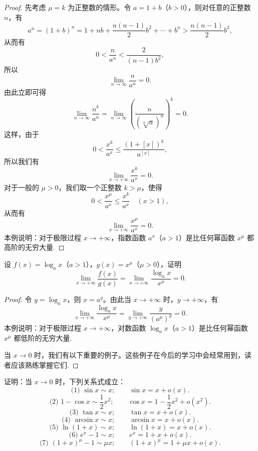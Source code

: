 \begin{proof}
先考虑 $\mu=k$ 为正整数的情形。令 $a=1+b$（$b>0$），则对任意的正整数 $n$，有
\[
  a^n=(1+b)^n
  =
  1+nb+\frac{n(n-1)}2b^2+\cdots+b^n
  >
  \frac{n(n-1)}2b^2,
\]
从而有
\[
  0<\frac n{a^n}<\frac2{(n-1)b^2},
\]
所以
\[
  \lim_{n\to\infty}\frac n{a^n}=0.
\]
由此立即可得
\[
  \lim_{n\to\infty}\frac{n^k}{a^n}
  =
  \lim_{n\to\infty}
  \left(\frac{n}{(\sqrt[k]{a})^n}\right)^k
  =
  0.
\]
这样，由于
\[
  0<\frac{x^k}{a^x}\leqslant \frac{(1+[x])^k}{a^{[x]}},
\]
所以我们有
\[
  \lim_{x\to+\infty}\frac{x^k}{a^x}=0.
\]
对于一般的 $\mu>0$，我们取一个正整数 $k>\mu$，使得
\[
  0<\frac{x^\mu}{a^x}\leqslant\frac{x^k}{a^x}\quad(x>1),
\]
从而有
\[
  \lim_{x\to+\infty}\frac{x^\mu}{a^x}=0.
\]
本例说明：对于极限过程 $x\to+\infty$，指数函数 $a^x$（$a>1$）是比任何幂函数 $x^\mu$ 都高阶的无穷大量.
\end{proof}


\begin{example}\label{example:ma-3-4-5}
设 $f(x)=\log_a x$（$a>1$），$g(x)=x^\mu$（$\mu>0$），证明
\[
  \lim_{x\to+\infty}\frac{f(x)}{g(x)}
  =
  \lim_{x\to+\infty}\frac{\log_a x}{x^\mu}=0.
\]
\end{example}


\begin{proof}
令 $y=\log_a x$，则 $x=a^y$。由此当 $x\to+\infty$ 时，$y\to+\infty$，有
\[
  \lim_{x\to+\infty}\frac{\log_a x}{x^\mu}
  =
  \lim_{y\to+\infty}\frac{y}{(a^\mu)^y}=0.
\]
本例说明：对于极限过程 $x\to+\infty$，对数函数 $\log_a x$（$a>1$）是比任何幂函数 $x^\mu$ 都低阶的无穷大量.

当 $x\to0$ 时，我们有以下重要的例子。这些例子在今后的学习中会经常用到，读者应该熟练掌握它们.
\end{proof}


\begin{example}\label{example:ma-3-4-6}
证明：当 $x\to0$ 时，下列关系式成立：
\[
  \text{(1) }\sin x\sim x;\qquad \sin x=x+o(x).
\]
\[
  \text{(2) }1-\cos x\sim\frac12x^2;\qquad
  \cos x=1-\frac12x^2+o(x^2).
\]
\[
  \text{(3) }\tan x\sim x;\qquad \tan x=x+o(x).
\]
\[
  \text{(4) }\arcsin x\sim x;\qquad \arcsin x=x+o(x).
\]
\[
  \text{(5) }\ln(1+x)\sim x;\qquad \ln(1+x)=x+o(x).
\]
\[
  \text{(6) }e^x-1\sim x;\qquad e^x=1+x+o(x).
\]
\[
  \text{(7) }(1+x)^\mu-1\sim\mu x;\qquad
  (1+x)^\mu=1+\mu x+o(x).
\]
\end{example}


